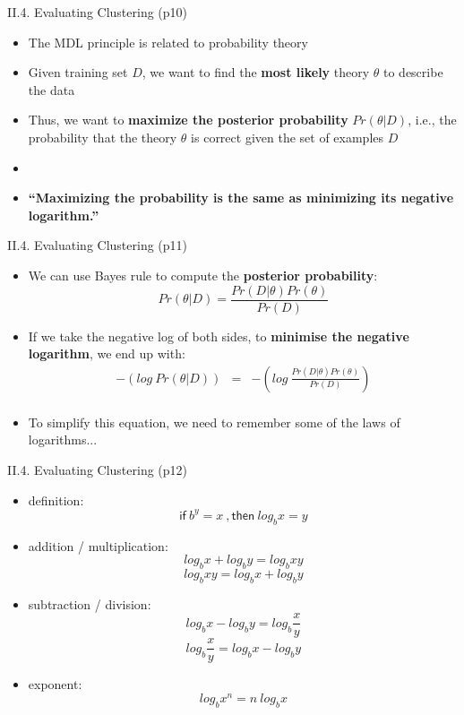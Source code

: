 \documentclass[handout]{beamer}
\newcommand{\strong}[1]{\textbf{\color{teal} #1}}
\newcommand{\stronger}[1]{\textbf{\color{purple} #1}}
\begin{document}
\begin{frame}{II.4. Evaluating Clustering (p10)}
\begin{itemize}
\item The MDL principle is related to probability theory
\item Given training set $D$, we want to find the \strong{most likely} theory $\theta$ to describe the data
\item Thus, we want to \strong{maximize the posterior probability} $Pr(\theta|D)$,
i.e., the probability that the theory $\theta$ is correct given the set of examples $D$
\item[]
\item \strong{``Maximizing the probability is the same as minimizing its negative logarithm.''}
\cite[Section 5.9]{WFH3:2011}\\
\end{itemize}
\end{frame}
\begin{frame}{II.4. Evaluating Clustering (p11)}
\begin{itemize}
\item We can use Bayes rule to compute the \stronger{posterior probability}:
\[
Pr(\theta|D) = \frac{Pr(D|\theta)Pr(\theta)}{Pr(D)}
\]
\item If we take the negative log of both sides, to \strong{minimise the negative logarithm}, we end up with:
\begin{eqnarray*}
-(log ~ Pr(\theta|D)) & = & -(log ~ \frac{ Pr(D|\theta)Pr(\theta) }{ Pr(D) }) \\ 
\end{eqnarray*}
\item To simplify this equation, we need to remember some of the laws of logarithms...
\end{itemize}
\end{frame}
\begin{frame}{II.4. Evaluating Clustering (p12)}
\begin{itemize}
\item definition:
\[
\mathsf{if} ~ b^y = x ~ \mathsf{, then} ~ log_b{x} = y
\]
%
\item addition / multiplication:
\[
log_b{x} + log_b{y} = log_b{xy}
\]
\[
log_b{xy} = log_b{x} + log_b{y}
\]
%
\item subtraction / division:
\[
log_b{x} - log_b{y} = log_b\frac{x}{y}
\]
\[
log_b\frac{x}{y} = log_b{x} - log_b{y}
\]
%
\item exponent:
\[
log_b{x^n} = n ~ log_b{x}
\]
%
\end{itemize}
\end{frame}
\end{document}

